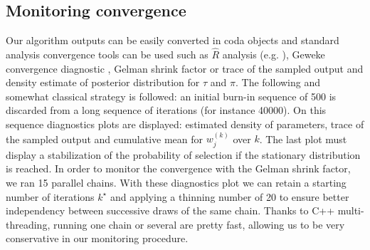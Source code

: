 \documentclass[journal]{IEEEtran}
\begin{document}
\subsection*{Monitoring convergence}
Our algorithm outputs can be easily converted in coda objects
\cite{coda} and standard analysis convergence tools can be used such
as $\hat R$ analysis (e.g. \cite{bayesiandataanalysis}), Geweke
convergence diagnostic \cite{gewekediagnostic}, Gelman shrink factor
\cite{bayesiandataanalysis} or trace of the sampled output and density
estimate of posterior distribution for $\tau$ and $\pi$. The following
and somewhat classical strategy is followed: an initial burn-in
sequence of 500 is discarded from a long sequence of iterations (for
instance 40000). On this sequence diagnostics plots are displayed:
estimated density of parameters, trace of the sampled output and
cumulative mean for $w_j^{(k)}$ over $k$. The last plot must display a
stabilization of the probability of selection if the stationary
distribution is reached. In order to monitor the convergence with the
Gelman shrink factor, we ran 15 parallel chains.  With these
diagnostics plot we can retain a starting number of iterations
$k^\star$ and applying a thinning number of 20 to ensure better
independency between successive draws of the same chain. Thanks to C++
multi-threading, running one chain or several are pretty fast,
allowing us to be very conservative in our monitoring procedure.
\end{document}
